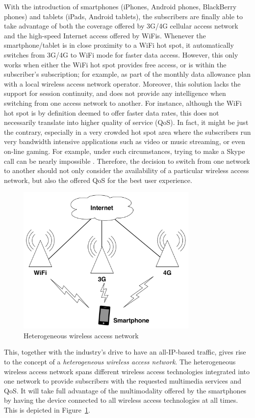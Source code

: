 With the introduction of smartphones (iPhones, Android phones, BlackBerry phones) and tablets (iPads, Android tablets), the subscribers are finally able to take advantage of both the coverage offered by 3G/4G cellular access network and the high-speed Internet access offered by WiFis. Whenever the smartphone/tablet is in close proximity to a WiFi hot spot, it automatically switches from 3G/4G to WiFi mode for faster data access. However, this only works when either the WiFi hot spot provides free access, or is within the subscriber's subscription; for example, as part of the monthly data allowance plan with a local wireless access network operator. Moreover, this solution lacks the support for session continuity, and does not provide any intelligence when switching from one access network to another. For instance, although the WiFi hot spot is by definition deemed to offer faster data rates, this does not necessarily translate into higher quality of service (QoS). In fact, it might be just the contrary, especially in a very crowded hot spot area where the subscribers run very bandwidth intensive applications such as video or music streaming, or even on-line gaming. For example, under such circumstances, trying to make a Skype call can be nearly impossible \cite{Wisely4gWLAN09}. Therefore, the decision to switch from one network to another should not only consider the availability of a particular wireless access network, but also the offered QoS for the best user experience.

\begin{figure}[t]
    \centering
    \includegraphics[width=3.5in]{Intelligent/Figures/heterogeneous}
    \caption{Heterogeneous wireless access network}
    \label{fig:heterogeneous_intelligent}
\end{figure}

This, together with the industry's drive to have an all-IP-based traffic, gives rise to the concept of a \emph{heterogeneous wireless access network}. The heterogeneous wireless access network spans different wireless access technologies integrated into one network to provide subscribers with the requested multimedia services and QoS. It will take full advantage of the multimodality offered by the smartphones by having the device connected to all wireless access technologies at all times. This is depicted in Figure~\ref{fig:heterogeneous_intelligent}.

